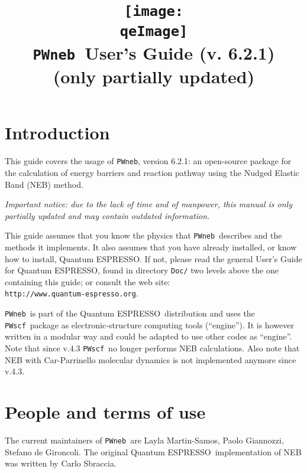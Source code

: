 \documentclass[12pt,a4paper]{article}
\def\version{6.2.1}
\def\qe{{\sc Quantum ESPRESSO}}
\def\NEB{\texttt{PWneb}} %
\def\PWscf{\texttt{PWscf}}
\begin{document}
 
\author{}
\date{}

\def\qeImage{../../Doc/quantum_espresso}

\title{
  \texttt{[image: \\qeImage]} \\
  \Huge \NEB\ User's Guide (v. \version)
  \\ \Large (only partially updated)
}

\maketitle

\tableofcontents

\section{Introduction}

This guide covers the usage of \NEB, version \version: 
an open-source package for the calculation of energy barriers 
and reaction pathway using the Nudged Elastic Band (NEB) method.

{\em Important notice: due to the lack of time and of manpower, this
manual is only partially updated and may contain outdated information.}

This guide assumes that you know the physics 
that \NEB\ describes and the methods it implements.
It also assumes  that you have already installed,
or know how to install, \qe. If not, please read
the general User's Guide for \qe, found in 
directory \texttt{Doc/} two levels above the 
one containing this guide; or consult the web site:\\
\texttt{http://www.quantum-espresso.org}.

\NEB \ is part of the \qe \ distribution and uses the \PWscf\
package as electronic-structure computing tools (``engine''). 
It is however written in a modular way and could be adapted 
to use other codes as ``engine''. Note that since v.4.3 \PWscf\ no 
longer performs NEB calculations. Also note that NEB with 
Car-Parrinello molecular dynamics is not implemented anymore since v.4.3.

\section{People and terms of use}
The current maintainers of \NEB\ are Layla Martin-Samos,
Paolo Giannozzi, Stefano de Gironcoli.
The original \qe \ implementation of NEB was written 
by Carlo Sbraccia.
\end{document}
